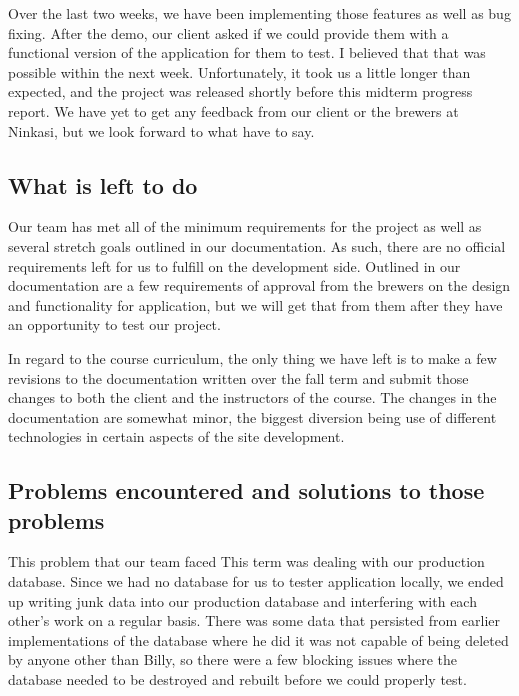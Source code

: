 \documentclass[draftclsnofoot,onecolumn,letterpaper,10pt,compsoc]{IEEEtran}
\begin{document}
Over the last two weeks, we have been implementing those features as well as bug fixing.
After the demo, our client asked if we could provide them with a functional version of the application for them to test.
I believed that that was possible within the next week.
Unfortunately, it took us a little longer than expected, and the project was released shortly before this midterm progress report.
We have yet to get any feedback from our client or the brewers at Ninkasi, but we look forward to what have to say.



\subsection{What is left to do}

Our team has met all of the minimum requirements for the project as well as several stretch goals outlined in our documentation.
As such, there are no official requirements left for us to fulfill on the development side.
Outlined in our documentation are a few requirements of approval from the brewers on the design and functionality for application, but we will get that from them after they have an opportunity to test our project.


In regard to the course curriculum, the only thing we have left is to make a few revisions to the documentation written over the fall term and submit those changes to both the client and the instructors of the course.
The changes in the documentation are somewhat minor, the biggest diversion being use of different technologies in certain aspects of the site development.



\subsection{Problems encountered and solutions to those problems}

This problem that our team faced This term was dealing with our production database.
Since we had no database for us to tester application locally, we ended up writing junk data into our production database and interfering with each other’s work on a regular basis.
There was some data that persisted from earlier implementations of the database where he did it was not capable of being deleted by anyone other than Billy, so there were a few blocking issues where the database needed to be destroyed and rebuilt before we could properly test.
\end{document}
